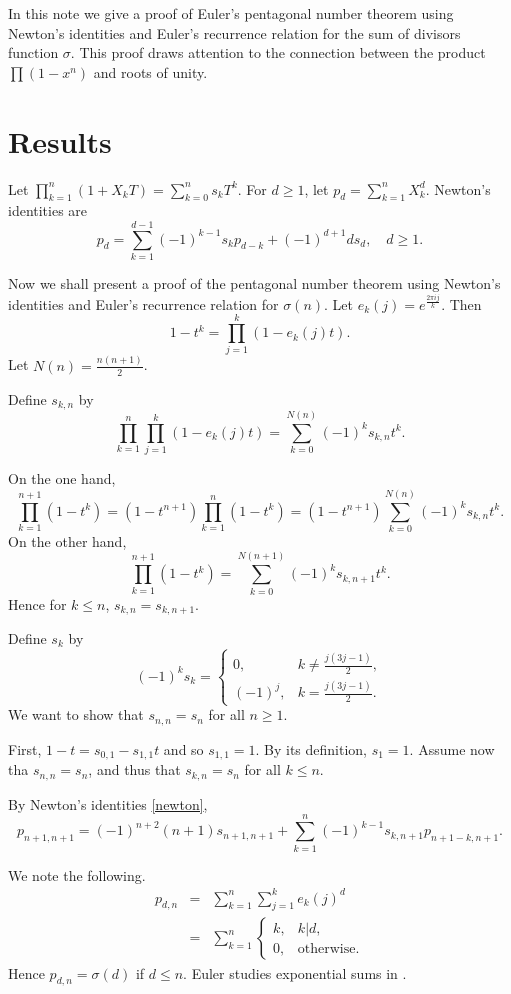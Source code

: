 \documentclass{article}
\theoremstyle{definition}
\begin{document}
In this note we give a proof of Euler's pentagonal number theorem using
Newton's identities and Euler's recurrence relation for the sum of divisors function
$\sigma$. This proof draws attention to the connection between the product
$\prod (1-x^n)$ and roots of unity.

\section{Results}
Let $\prod_{k=1}^n (1+X_k T)=\sum_{k=0}^n s_k T^k$.
For $d \geq 1$, let $p_d=\sum_{k=1}^n X_k^d$.
Newton's identities \cite[IV.65]{MR643362} are
\begin{equation}
\label{newton}
p_d=\sum_{k=1}^{d-1} (-1)^{k-1} s_k p_{d-k} +(-1)^{d+1} ds_d,
\quad d \geq 1.
\end{equation}

Now we shall present a proof of the pentagonal number theorem
using Newton's identities and Euler's recurrence relation for $\sigma(n)$.
Let $e_k(j)=e^{\frac{2\pi ij}{k}}$. Then
\[
1-t^k=\prod_{j=1}^k (1-e_k(j)t).
\]
Let $N(n)=\frac{n(n+1)}{2}$.

Define $s_{k,n}$ by
\[
\prod_{k=1}^n \prod_{j=1}^k (1-e_k(j)t)
=\sum_{k=0}^{N(n)} (-1)^k s_{k,n} t^k.
\]

On the one hand,
\[
\prod_{k=1}^{n+1}(1-t^k)=(1-t^{n+1})\prod_{k=1}^n (1-t^k)
=(1-t^{n+1})\sum_{k=0}^{N(n)} (-1)^k s_{k,n} t^k.
\]
On the other hand,
\[
\prod_{k=1}^{n+1}(1-t^k)=\sum_{k=0}^{N(n+1)} (-1)^k s_{k,n+1} t^k.
\]
Hence for $k \leq n$, $s_{k,n}=s_{k,n+1}$.

Define $s_k$ by
\[
(-1)^k s_k=\begin{cases}0,&k \neq \frac{j(3j-1)}{2},\\
(-1)^j,&k=\frac{j(3j-1)}{2}.
\end{cases}
\]
We want to show that $s_{n,n}=s_n$ for all $n \geq 1$.

First, $1-t=s_{0,1}-s_{1,1}t$ and so $s_{1,1}=1$. By its definition,
$s_1=1$. Assume now tha
$s_{n,n}=s_n$, and thus that
$s_{k,n}=s_n$ for all $k \leq n$. 

By Newton's identities \eqref{newton},
\[
p_{n+1,n+1}=(-1)^{n+2}(n+1)s_{n+1,n+1}
+\sum_{k=1}^n (-1)^{k-1} s_{k,n+1}p_{n+1-k,n+1}.
\]

We note the following.
\begin{eqnarray*}
p_{d,n}&=&\sum_{k=1}^n \sum_{j=1}^k e_k(j)^d\\
&=&\sum_{k=1}^n \begin{cases}
k,&k|d,\\
0,&\textrm{otherwise}.
\end{cases}
\end{eqnarray*}
Hence $p_{d,n}=\sigma(d)$ if $d \leq n$.
Euler studies exponential sums in \cite{E447}.
\end{document}
